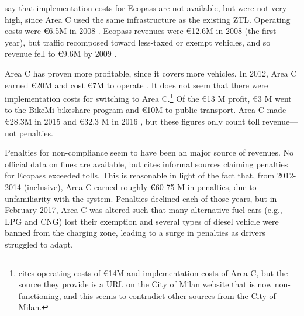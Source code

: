 \citet{Rotaris2010} say that implementation costs for Ecopass are not available, but were not very high, since Area C used the same infrastructure as the existing ZTL. Operating costs were \euro 6.5M in 2008 \citep[p. 49]{AMMA2009}. Ecopass revenues were \euro 12.6M in 2008 (the first year), but traffic recomposed toward less-taxed or exempt vehicles, and so revenue fell to \euro 9.6M by 2009 \citep[p. 51]{AMAT2010}. 

Area C has proven more profitable, since it covers more vehicles. In 2012, Area C earned \euro 20M and cost \euro 7M to operate \citep{Beria2015}. It does not seem that there were implementation costs for switching to Area C.\footnote{\citet{Croci2016} cites operating costs of \euro 14M and implementation costs of Area C, but the source they provide is a URL on the City of Milan website that is now non-functioning, and this seems to contradict other sources from the City of Milan.} Of the \euro 13 M profit, \euro 3 M went to the BikeMi bikeshare program and \euro 10M to public transport. Area C made \euro 28.3M in 2015 \citep[p. 28]{Milan2016} and \euro 32.3 M in 2016 \citep[p. 25]{Milan2017}, but these figures only count toll revenue---not penalties. 

Penalties for non-compliance seem to have been an major source of revenues. No official data on fines are available, but \citet{Rotaris2010} cites informal sources claiming  penalties for Ecopass exceeded tolls. This is reasonable in light of the fact that, from 2012-2014 (inclusive), Area C earned roughly \euro 60-75 M in penalties, due to unfamiliarity with the system. Penalties declined each of those years, but in February 2017, Area C was altered such that many alternative fuel cars (e.g., LPG and CNG) lost their exemption and several types of diesel vehicle were banned from the charging zone, leading to a surge in penalties as drivers struggled to adapt.

